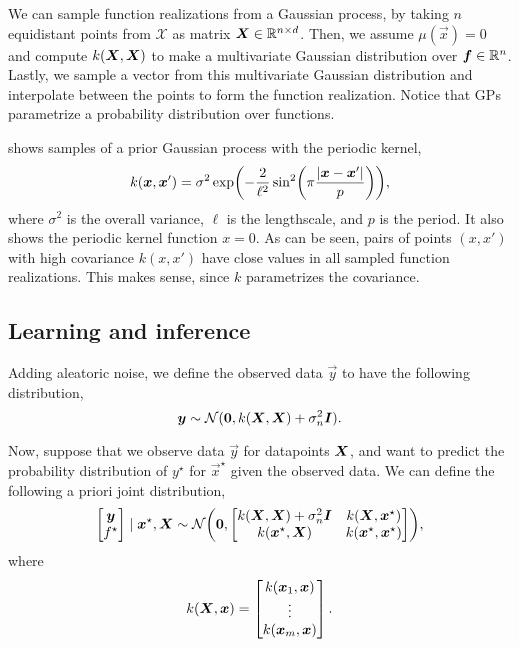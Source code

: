 We can sample function realizations from a Gaussian process, by taking $n$
equidistant points from $\mathcal{X}$ as matrix $\bm{X}\in\mathbb{R}^{n\times d}$.
Then, we assume $\mu(\vec{x}) = 0$ and compute $k(\bm{X},\bm{X})$ to make a
multivariate Gaussian distribution over $\bm{f}\in\mathbb{R}^n$. Lastly, we sample a
vector from this multivariate Gaussian distribution and interpolate between the
points to form the function realization. Notice that GPs parametrize a
probability distribution over functions.

 shows samples of a prior Gaussian process with the periodic
kernel, \[
  k(\vec{x},\vec{x}') = \sigma^2 \exp \lft( -\frac{2}{\ell^2}\sin^2\lft(\pi
  \frac{|\vec{x}-\vec{x}'|}{p} \rgt) \rgt),
\]
where $\sigma^2$ is the overall variance, $\ell$ is the lengthscale, and $p$ is
the period. It also shows the periodic kernel function \wrt $x=0$. As can be
seen, pairs of points $(x,x')$ with high covariance $k(x,x')$ have close values
in all sampled function realizations. This makes sense, since $k$ parametrizes
the covariance.

\subsection{Learning and inference}

Adding aleatoric noise, we define the observed data $\vec{y}$ to have the
following distribution, \[
  \bm{y} \sim \mathcal{N}(\bm{0}, k(\bm{X}, \bm{X}) + \sigma_n^2\bm{I}).
\]

Now, suppose that we observe data $\vec{y}$ for datapoints $\bm{X}$, and want
to predict the probability distribution of $y^\star$ for $\vec{x}^\star$ given
the observed data. We can define the following a priori joint
distribution, \[
  \begin{bmatrix}
    \vec{y} \\
    f^\star
  \end{bmatrix} \mid \vec{x}^\star, \vec{X}
  \sim
  \mathcal{N} \lft(
  \vec{0},
  \begin{bmatrix}
    k(\mat{X},\mat{X}) + \sigma_n^2\mat{I} & k(\mat{X},\vec{x}^\star) \\
    k(\vec{x}^\star,\mat{X}) & k(\vec{x}^\star, \vec{x}^\star)
  \end{bmatrix} \rgt),
\]
where \[
  k(\bm{X},\bm{x}) = \begin{bmatrix} k(\bm{x}_1,\bm{x}) \\ \vdots \\ k(\bm{x}_m,\bm{x}) \end{bmatrix}.
\]

